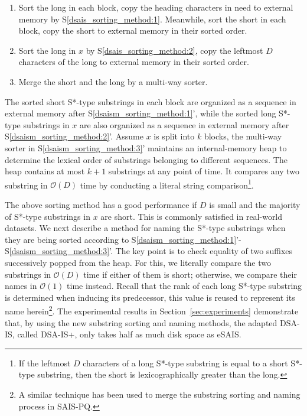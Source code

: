 \documentclass[10pt,journal,compsoc]{IEEEtran}
\begin{document}
\begin{enumerate}[S1']
	\item Sort the long in each block, copy the heading characters in need to external memory by S\ref{dsais_sorting_method:1}. Meanwhile, sort the short in each block, copy the short to external memory in their sorted order.~\label{dsaism_sorting_method:1}
	
	\item Sort the long in $x$ by S\ref{dsais_sorting_method:2}, copy the leftmost $D$ characters of the long to external memory in their sorted order.~\label{dsaism_sorting_method:2}
	
	\item Merge the short and the long by a multi-way sorter.~\label{dsaism_sorting_method:3}
\end{enumerate}

The sorted short S*-type substrings in each block are organized as a sequence in external memory after S\ref{dsaism_sorting_method:1}', while the sorted long S*-type substrings in $x$ are also organized as a sequence in external memory after S\ref{dsaism_sorting_method:2}'. Assume $x$ is split into $k$ blocks, the multi-way sorter in S\ref{dsaism_sorting_method:3}' maintains an internal-memory heap to determine the lexical order of substrings belonging to different sequences. The heap contains at most $k + 1$ substrings at any point of time. It compares any two substring in $\mathcal{O}(D)$ time by conducting a literal string comparison\footnote{If the leftmost $D$ characters of a long S*-type substring is equal to a short S*-type substring, then the short is lexicographically greater than the long.}. 

The above sorting method has a good performance if $D$ is small and the majority of S*-type substrings in $x$ are short. This is commonly satisfied in real-world datasets. We next describe a method for naming the S*-type substrings when they are being sorted according to S\ref{dsaism_sorting_method:1}'-S\ref{dsaism_sorting_method:3}'. The key point is to check equality of two suffixes successively popped from the heap. For this, we literally compare the two substrings in $\mathcal{O}(D)$ time if either of them is short; otherwise, we compare their names in $\mathcal{O}(1)$ time instead. Recall that the rank of each long S*-type substring is determined when inducing its predecessor, this value is reused to represent its name herein\footnote{A similar technique has been used to merge the substring sorting and naming process in SAIS-PQ.}. The experimental results in Section~\ref{sec:experiments} demonstrate that, by using the new substring sorting and naming methods, the adapted DSA-IS, called DSA-IS+, only takes half as much disk space as eSAIS.
\end{document}
